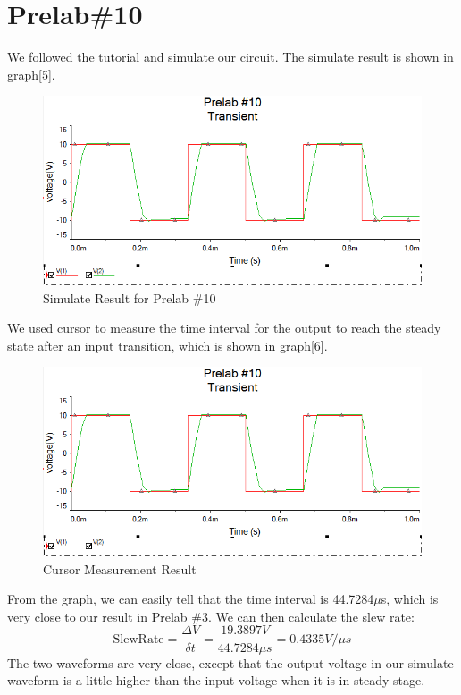 \documentclass{IEEEtran}
\begin{document}
	\section{\textbf{Prelab\#10}}
	We followed the tutorial and simulate our circuit. The simulate result is shown in graph[5].
	\begin{figure}[!htbp]
		\centering
		\label{fig:1001}
		\begin{framed}
			\includegraphics[width=\linewidth]{images/10_1.PNG}
			\caption{Simulate Result for Prelab \#10}
		\end{framed}
	\end{figure}
	We used cursor to measure the time interval for the output to reach the steady state after an input transition, which is shown in graph[6].
	\begin{figure}[!htbp]
		\centering
		\label{fig:1002}
		\begin{framed}
			\includegraphics[width=\linewidth]{images/10_1.PNG}
			\caption{Cursor Measurement Result}
		\end{framed}
	\end{figure}
	From the graph, we can easily tell that the time interval is 44.7284$\mu$s, which is very close to our result in Prelab \#3. We can then calculate the slew rate:\\
	\begin{equation*}
		\mathrm{SlewRate} = \frac{\Delta V}{\delta t} = \frac{19.3897 \si{V}}{44.7284\si{\mu s}} = 0.4335\si{V/\mu s}
	\end{equation*}
	The two waveforms are very close, except that the output voltage in our simulate waveform is a little higher than the input voltage when it is in steady stage.\\
\end{document}
